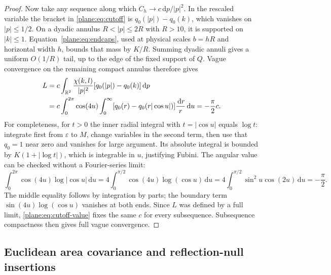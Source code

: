\documentclass[11pt]{article}
\theoremstyle{definition}
\theoremstyle{remark}
\numberwithin{equation}{section}
\begin{document}
\begin{proof}
Now take any sequence along which $C_h\to c\,\mathrm d p/|p|^2$.
In the rescaled variable the bracket in \eqref{plane:eq:cutoff} is
$q_0(|p|)-q_0(k)$, which vanishes on $|p|\le1/2$.
On a dyadic annulus $R<|p|\le2R$ with $R>10$, it is supported on
$|k|\le1$.  Equation~\eqref{plane:eq:endcaps}, used at physical
scales $b=hR$ and horizontal width $h$, bounds that mass by $K/R$.
Summing dyadic annuli gives a uniform $O(1/R)$ tail, up to the edge
of the fixed support of $Q$.  Vague convergence on the remaining
compact annulus therefore gives
\begin{align}
 L&=c\int_{\mathbb R^2}\frac{\chi(k,l)}{|p|^2}
              [q_0(|p|)-q_0(k)]\,\mathrm d p \notag\\
  &=c\int_0^{2\pi}\cos(4u)
       \int_0^\infty[q_0(r)-q_0(r|\cos u|)]\frac{\,\mathrm d r}{r}\,\mathrm d u
    =-\frac\pi2c.                       \label{plane:eq:cutoff-value}
\end{align}
For completeness, for $t>0$ the inner radial integral with $t=|\cos u|$
equals $\log t$: integrate first from $\varepsilon$ to $M$, change
variables in the second term, then use that $q_0=1$ near zero and
vanishes for large argument.  Its absolute integral is bounded by
$K(1+|\log t|)$, which is integrable in $u$, justifying Fubini.
The angular value can be checked without a Fourier-series limit:
\[
 \int_0^{2\pi}\cos(4u)\log|\cos u|\,\mathrm d u
 =4\int_0^{\pi/2}\cos(4u)\log(\cos u)\,\mathrm d u
 =4\int_0^{\pi/2}\sin^2u\cos(2u)\,\mathrm d u
 =-\frac\pi2.
\]
The middle equality follows by integration by parts; the boundary
term $\sin(4u)\log(\cos u)$ vanishes at both ends.
Since $L$ was defined by a full limit, \eqref{plane:eq:cutoff-value}
fixes the same $c$ for every subsequence.  Subsequence compactness
then gives full vague convergence.
\end{proof}

\subsection{Euclidean area covariance and reflection-null insertions}
\end{document}
